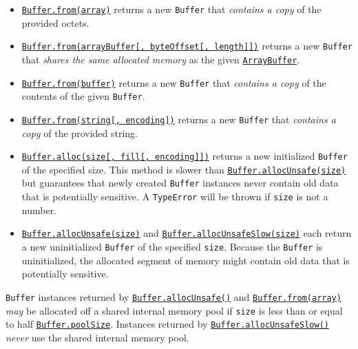 \begin{itemize}
\tightlist
\item
  \hyperref[static-method-bufferfromarray]{\texttt{Buffer.from(array)}}
  returns a new \texttt{Buffer} that \emph{contains a copy} of the
  provided octets.
\item
  \hyperref[static-method-bufferfromarraybuffer-byteoffset-length]{\texttt{Buffer.from(arrayBuffer{[},\ byteOffset{[},\ length{]}{]})}}
  returns a new \texttt{Buffer} that \emph{shares the same allocated
  memory} as the given
  \href{https://developer.mozilla.org/en-US/docs/Web/JavaScript/Reference/Global_Objects/ArrayBuffer}{\texttt{ArrayBuffer}}.
\item
  \hyperref[static-method-bufferfrombuffer]{\texttt{Buffer.from(buffer)}}
  returns a new \texttt{Buffer} that \emph{contains a copy} of the
  contents of the given \texttt{Buffer}.
\item
  \hyperref[static-method-bufferfromstring-encoding]{\texttt{Buffer.from(string{[},\ encoding{]})}}
  returns a new \texttt{Buffer} that \emph{contains a copy} of the
  provided string.
\item
  \hyperref[static-method-bufferallocsize-fill-encoding]{\texttt{Buffer.alloc(size{[},\ fill{[},\ encoding{]}{]})}}
  returns a new initialized \texttt{Buffer} of the specified size. This
  method is slower than
  \hyperref[static-method-bufferallocunsafesize]{\texttt{Buffer.allocUnsafe(size)}}
  but guarantees that newly created \texttt{Buffer} instances never
  contain old data that is potentially sensitive. A \texttt{TypeError}
  will be thrown if \texttt{size} is not a number.
\item
  \hyperref[static-method-bufferallocunsafesize]{\texttt{Buffer.allocUnsafe(size)}}
  and
  \hyperref[static-method-bufferallocunsafeslowsize]{\texttt{Buffer.allocUnsafeSlow(size)}}
  each return a new uninitialized \texttt{Buffer} of the specified
  \texttt{size}. Because the \texttt{Buffer} is uninitialized, the
  allocated segment of memory might contain old data that is potentially
  sensitive.
\end{itemize}

\texttt{Buffer} instances returned by
\hyperref[static-method-bufferallocunsafesize]{\texttt{Buffer.allocUnsafe()}}
and
\hyperref[static-method-bufferfromarray]{\texttt{Buffer.from(array)}}
\emph{may} be allocated off a shared internal memory pool if
\texttt{size} is less than or equal to half
\hyperref[class-property-bufferpoolsize]{\texttt{Buffer.poolSize}}.
Instances returned by
\hyperref[static-method-bufferallocunsafeslowsize]{\texttt{Buffer.allocUnsafeSlow()}}
\emph{never} use the shared internal memory pool.

